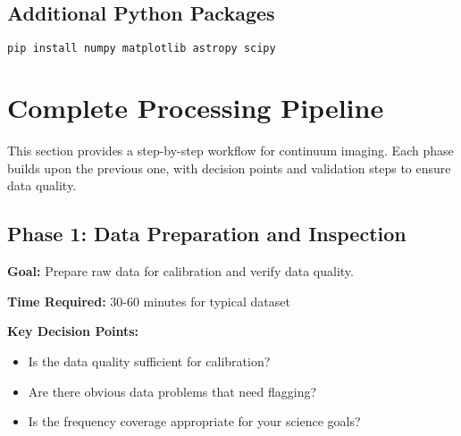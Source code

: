 \documentclass[11pt]{article}
\begin{document}
\subsection{Additional Python Packages}
\begin{lstlisting}[language=bash]
pip install numpy matplotlib astropy scipy
\end{lstlisting}

\section{Complete Processing Pipeline}

This section provides a step-by-step workflow for continuum imaging. Each phase builds upon the previous one, with decision points and validation steps to ensure data quality.

\subsection{Phase 1: Data Preparation and Inspection}

\textbf{Goal:} Prepare raw data for calibration and verify data quality.

\textbf{Time Required:} 30-60 minutes for typical dataset

\textbf{Key Decision Points:}
\begin{itemize}
    \item Is the data quality sufficient for calibration?
    \item Are there obvious data problems that need flagging?
    \item Is the frequency coverage appropriate for your science goals?
\end{itemize}
\end{document}
